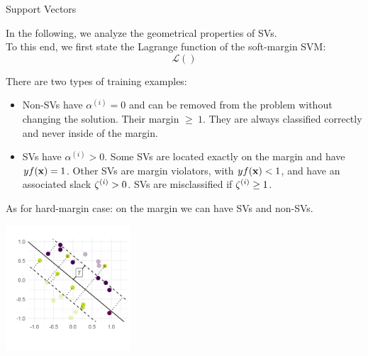 \documentclass[11pt,compress,t,notes=noshow, xcolor=table]{beamer}
\begin{document}
\begin{vbframe}{Support Vectors}

In the following, we analyze the geometrical properties of SVs. \\
To this end, we first state the Lagrange function of the soft-margin SVM:
$$\mathcal{L}()$$


\framebreak

\begin{small}
  There are two types of training examples:


\begin{itemize}
    \item Non-SVs have $\alpha^{(i)} = 0$ and can be
    removed from the problem without changing the solution. Their margin $\geq ~ 1.$ 
    They are always classified correctly and never inside of the margin. 
    
    \item SVs have $\alpha^{(i)} > 0.$ 
    Some SVs are located exactly on the
    margin and have $yf(\mathbf{x})=1$. Other SVs are margin violators, with $yf(\mathbf{x}) < 1$, 
     and have an associated
     slack $\zeta^{(i)} > 0$. 
     SVs are misclassified if $\zeta^{(i)} \geq 1$.
\end{itemize}
\end{small}
As for hard-margin case: on the margin we can have SVs and non-SVs.

\vspace{0.1cm}
\begin{center}
\includegraphics[width = 0.35\textwidth ]{figure/soft_margin_svs.png} \\
\end{center}
\end{vbframe}










\endlecture
\end{document}
